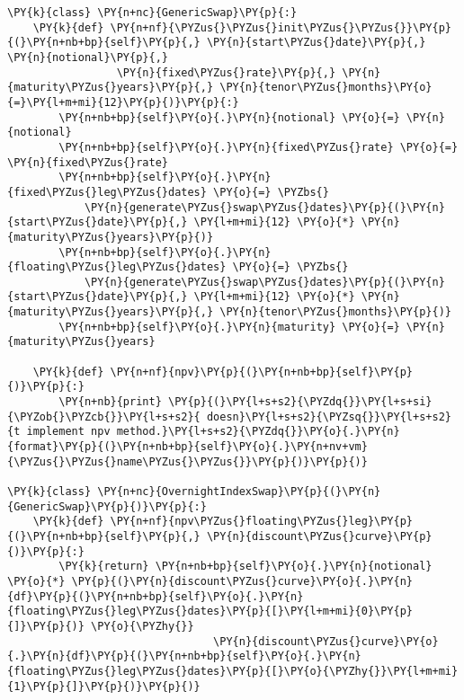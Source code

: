\begin{tcolorbox}[breakable, size=fbox, boxrule=1pt, pad at break*=1mm,colback=cellbackground, colframe=cellborder]
\begin{Verbatim}[commandchars=\\\{\}]
\PY{k}{class} \PY{n+nc}{GenericSwap}\PY{p}{:}
    \PY{k}{def} \PY{n+nf}{\PYZus{}\PYZus{}init\PYZus{}\PYZus{}}\PY{p}{(}\PY{n+nb+bp}{self}\PY{p}{,} \PY{n}{start\PYZus{}date}\PY{p}{,} \PY{n}{notional}\PY{p}{,} 
                 \PY{n}{fixed\PYZus{}rate}\PY{p}{,} \PY{n}{maturity\PYZus{}years}\PY{p}{,} \PY{n}{tenor\PYZus{}months}\PY{o}{=}\PY{l+m+mi}{12}\PY{p}{)}\PY{p}{:}
        \PY{n+nb+bp}{self}\PY{o}{.}\PY{n}{notional} \PY{o}{=} \PY{n}{notional}
        \PY{n+nb+bp}{self}\PY{o}{.}\PY{n}{fixed\PYZus{}rate} \PY{o}{=} \PY{n}{fixed\PYZus{}rate}
        \PY{n+nb+bp}{self}\PY{o}{.}\PY{n}{fixed\PYZus{}leg\PYZus{}dates} \PY{o}{=} \PYZbs{}
            \PY{n}{generate\PYZus{}swap\PYZus{}dates}\PY{p}{(}\PY{n}{start\PYZus{}date}\PY{p}{,} \PY{l+m+mi}{12} \PY{o}{*} \PY{n}{maturity\PYZus{}years}\PY{p}{)}
        \PY{n+nb+bp}{self}\PY{o}{.}\PY{n}{floating\PYZus{}leg\PYZus{}dates} \PY{o}{=} \PYZbs{}
            \PY{n}{generate\PYZus{}swap\PYZus{}dates}\PY{p}{(}\PY{n}{start\PYZus{}date}\PY{p}{,} \PY{l+m+mi}{12} \PY{o}{*} \PY{n}{maturity\PYZus{}years}\PY{p}{,} \PY{n}{tenor\PYZus{}months}\PY{p}{)}
        \PY{n+nb+bp}{self}\PY{o}{.}\PY{n}{maturity} \PY{o}{=} \PY{n}{maturity\PYZus{}years}
	
    \PY{k}{def} \PY{n+nf}{npv}\PY{p}{(}\PY{n+nb+bp}{self}\PY{p}{)}\PY{p}{:}
        \PY{n+nb}{print} \PY{p}{(}\PY{l+s+s2}{\PYZdq{}}\PY{l+s+si}{\PYZob{}\PYZcb{}}\PY{l+s+s2}{ doesn}\PY{l+s+s2}{\PYZsq{}}\PY{l+s+s2}{t implement npv method.}\PY{l+s+s2}{\PYZdq{}}\PY{o}{.}\PY{n}{format}\PY{p}{(}\PY{n+nb+bp}{self}\PY{o}{.}\PY{n+nv+vm}{\PYZus{}\PYZus{}name\PYZus{}\PYZus{}}\PY{p}{)}\PY{p}{)}
	
\PY{k}{class} \PY{n+nc}{OvernightIndexSwap}\PY{p}{(}\PY{n}{GenericSwap}\PY{p}{)}\PY{p}{:}
    \PY{k}{def} \PY{n+nf}{npv\PYZus{}floating\PYZus{}leg}\PY{p}{(}\PY{n+nb+bp}{self}\PY{p}{,} \PY{n}{discount\PYZus{}curve}\PY{p}{)}\PY{p}{:}
        \PY{k}{return} \PY{n+nb+bp}{self}\PY{o}{.}\PY{n}{notional} \PY{o}{*} \PY{p}{(}\PY{n}{discount\PYZus{}curve}\PY{o}{.}\PY{n}{df}\PY{p}{(}\PY{n+nb+bp}{self}\PY{o}{.}\PY{n}{floating\PYZus{}leg\PYZus{}dates}\PY{p}{[}\PY{l+m+mi}{0}\PY{p}{]}\PY{p}{)} \PY{o}{\PYZhy{}}
                                \PY{n}{discount\PYZus{}curve}\PY{o}{.}\PY{n}{df}\PY{p}{(}\PY{n+nb+bp}{self}\PY{o}{.}\PY{n}{floating\PYZus{}leg\PYZus{}dates}\PY{p}{[}\PY{o}{\PYZhy{}}\PY{l+m+mi}{1}\PY{p}{]}\PY{p}{)}\PY{p}{)}
	

\end{Verbatim}
\end{tcolorbox}
